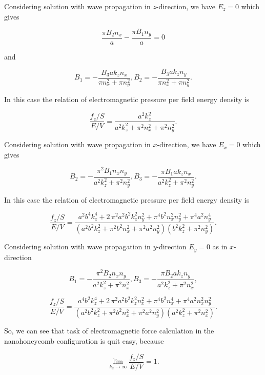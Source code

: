 \documentclass[twoside, 10pt]{article}
\begin{document}
\begin{multicols}{2}
Considering solution with wave propagation in \(z\)-direction, we have
\(E_z = 0\) which gives

\[\frac{\pi B_{2} n_{x}}{a} - \frac{\pi B_{1} n_{y}}{a} = 0\]

and

\[B_1 = -\frac{B_{3} a k_{z} n_{x}}{\pi n_{x}^{2} + \pi n_{y}^{2}},
B_2 = -\frac{B_{3} a k_{z} n_{y}}{\pi n_{x}^{2} + \pi n_{y}^{2}}.\]

In this case the relation of electromagnetic pressure per field energy density is

\begin{equation}\frac{f_z/S}{E/V} = \frac{a^{2} k_{z}^{2}}{a^{2} k_{z}^{2} + \pi^{2} n_{x}^{2} + \pi^{2} n_{y}^{2}}.\end{equation}

    Considering solution with wave propagation in \(x\)-direction, we have
\(E_x = 0\) which gives

\[B_2 = -\frac{\pi^{2} B_{1} n_{x} n_{y}}{a^{2} k_{z}^{2} + \pi^{2} n_{y}^{2}},
B_3 = -\frac{\pi B_{1} a k_{z} n_{x}}{a^{2} k_{z}^{2} + \pi^{2} n_{y}^{2}}.\]

In this case the relation of electromagnetic pressure per field energy density is

\[\frac{f_z/S}{E/V} = \frac{a^{2} b^{4} k_{z}^{4} + 2 \, \pi^{2} a^{2} b^{2} k_{z}^{2} n_{y}^{2} + \pi^{4} b^{2} n_{x}^{2} n_{y}^{2} + \pi^{4} a^{2} n_{y}^{4}}{{\left(a^{2} b^{2} k_{z}^{2} + \pi^{2} b^{2} n_{x}^{2} + \pi^{2} a^{2} n_{y}^{2}\right)} {\left(b^{2} k_{z}^{2} + \pi^{2} n_{y}^{2}\right)}}.\]

Considering solution with wave propagation in \(y\)-direction
\(E_y = 0\) as in \(x\)-direction

    \[B_1 = -\frac{\pi^{2} B_{2} n_{x} n_{y}}{a^{2} k_{z}^{2} + \pi^{2} n_{x}^{2}},
      B_3 = -\frac{\pi B_{2} a k_{z} n_{y}}{a^{2} k_{z}^{2} + \pi^{2} n_{x}^{2}},\]

\[\frac{f_z/S}{E/V} = \frac{a^{4} b^{2} k_{z}^{4} + 2 \, \pi^{2} a^{2} b^{2} k_{z}^{2} n_{x}^{2} + \pi^{4} b^{2} n_{x}^{4} + \pi^{4} a^{2} n_{x}^{2} n_{y}^{2}}{{\left(a^{2} b^{2} k_{z}^{2} + \pi^{2} b^{2} n_{x}^{2} + \pi^{2} a^{2} n_{y}^{2}\right)} {\left(a^{2} k_{z}^{2} + \pi^{2} n_{x}^{2}\right)}}.\]

    So, we can see that task of electromagnetic force calculation in the
nanohoneycomb configuration is quit easy, because

\begin{equation}\lim_{k_z \to \infty}\frac{f_z/S}{E/V} = 1.\end{equation}


\end{multicols}
\end{document}
